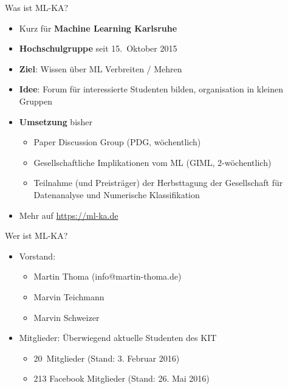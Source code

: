 \documentclass{beamer}
\begin{document}

\title{\titleText}
\date{ }
\subject{Machine Learning}

\frame{\titlepage}

\begin{frame}{Was ist ML-KA?}
    \begin{itemize}
        \item Kurz für \textbf{Machine Learning Karlsruhe}
        \item \textbf{Hochschulgruppe} seit 15.~Oktober 2015
        \item \textbf{Ziel}: Wissen über ML Verbreiten / Mehren
        \item \textbf{Idee}: Forum für interessierte Studenten bilden,
              organisation in kleinen Gruppen
        \item \textbf{Umsetzung} bisher
        \begin{itemize}
            \item Paper Discussion Group (PDG, wöchentlich)
            \item Gesellschaftliche Implikationen vom ML (GIML, 2-wöchentlich)
            \item Teilnahme (und Preisträger) der Herbsttagung der Gesellschaft
                  für Datenanalyse und Numerische Klassifikation
        \end{itemize}
        \item Mehr auf \href{https://ml-ka.de/}{https://ml-ka.de}
    \end{itemize}
\end{frame}

\begin{frame}{Wer ist ML-KA?}
    \begin{itemize}
        \item Vorstand:
        \begin{itemize}
            \item Martin Thoma (info@martin-thoma.de)
            \item Marvin Teichmann
            \item Marvin Schweizer
        \end{itemize}
        \item Mitglieder: Überwiegend aktuelle Studenten des KIT
        \begin{itemize}
            \item 20~Mitglieder (Stand: 3. Februar 2016)
            \item 213 Facebook Mitglieder (Stand: 26. Mai 2016)
        \end{itemize}
    \end{itemize}
\end{frame}
\end{document}
